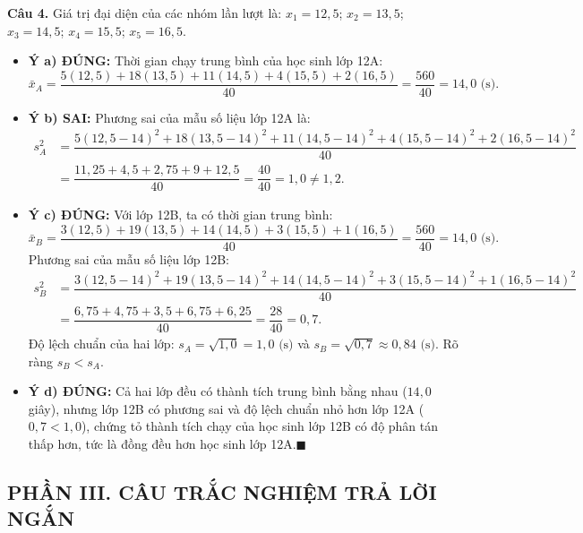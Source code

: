 \documentclass[12pt,a4paper]{article}
\begin{document}
\vspace{0.2cm}\noindent\textbf{Câu 4.}
Giá trị đại diện của các nhóm lần lượt là: $x_1 = 12{,}5$; $x_2 = 13{,}5$; $x_3 = 14{,}5$; $x_4 = 15{,}5$; $x_5 = 16{,}5$.
\begin{itemize}[leftmargin=*]
    \item \textbf{Ý a) ĐÚNG:} Thời gian chạy trung bình của học sinh lớp 12A:
    $$\bar{x}_A = \dfrac{5(12{,}5) + 18(13{,}5) + 11(14{,}5) + 4(15{,}5) + 2(16{,}5)}{40} = \dfrac{560}{40} = 14{,}0\text{ (s)}.$$
    \item \textbf{Ý b) SAI:} Phương sai của mẫu số liệu lớp 12A là:
    \begin{align*}
        s_A^2 &= \dfrac{5(12{,}5 - 14)^2 + 18(13{,}5 - 14)^2 + 11(14{,}5 - 14)^2 + 4(15{,}5 - 14)^2 + 2(16{,}5 - 14)^2}{40} \\
        &= \dfrac{11{,}25 + 4{,}5 + 2{,}75 + 9 + 12{,}5}{40} = \dfrac{40}{40} = 1{,}0 \ne 1{,}2.
    \end{align*}
    \item \textbf{Ý c) ĐÚNG:} Với lớp 12B, ta có thời gian trung bình:
    $$\bar{x}_B = \dfrac{3(12{,}5) + 19(13{,}5) + 14(14{,}5) + 3(15{,}5) + 1(16{,}5)}{40} = \dfrac{560}{40} = 14{,}0\text{ (s)}.$$
    Phương sai của mẫu số liệu lớp 12B:
    \begin{align*}
        s_B^2 &= \dfrac{3(12{,}5 - 14)^2 + 19(13{,}5 - 14)^2 + 14(14{,}5 - 14)^2 + 3(15{,}5 - 14)^2 + 1(16{,}5 - 14)^2}{40} \\
        &= \dfrac{6{,}75 + 4{,}75 + 3{,}5 + 6{,}75 + 6{,}25}{40} = \dfrac{28}{40} = 0{,}7.
    \end{align*}
    Độ lệch chuẩn của hai lớp: $s_A = \sqrt{1{,}0} = 1{,}0\text{ (s)}$ và $s_B = \sqrt{0{,}7} \approx 0{,}84\text{ (s)}$. Rõ ràng $s_B < s_A$.
    \item \textbf{Ý d) ĐÚNG:} Cả hai lớp đều có thành tích trung bình bằng nhau ($14{,}0$ giây), nhưng lớp 12B có phương sai và độ lệch chuẩn nhỏ hơn lớp 12A ($0{,}7 < 1{,}0$), chứng tỏ thành tích chạy của học sinh lớp 12B có độ phân tán thấp hơn, tức là đồng đều hơn học sinh lớp 12A.\hfill$\blacksquare$
\end{itemize}

\subsection*{\large PHẦN III. CÂU TRẮC NGHIỆM TRẢ LỜI NGẮN}
\end{document}
